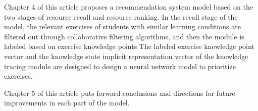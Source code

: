 Chapter 4 of this article proposes a recommendation system model based on the two stages of resource recall and resource ranking. In the recall stage of the model, the relevant exercises of students with similar learning conditions are filtered out through collaborative filtering algorithms, and then the module is labeled based on exercise knowledge points The labeled exercise knowledge point vector and the knowledge state implicit representation vector of the knowledge tracing module are designed to design a neural network model to prioritize exercises.

Chapter 5 of this article puts forward conclusions and directions for future improvements in each part of the model.

